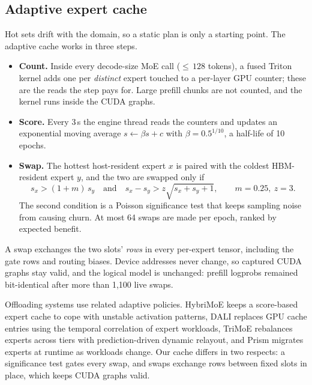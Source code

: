 \documentclass{article}
\begin{document}
\subsection{Adaptive expert cache}\label{sec:adapt}
Hot sets drift with the domain, so a static plan is only a starting point. The adaptive cache works in three steps.
\begin{itemize}
  \item \textbf{Count.} Inside every decode-size MoE call (${\leq}\,128$ tokens), a fused Triton kernel adds one per
        \emph{distinct} expert touched to a per-layer GPU counter; these are the reads the step pays for. Large
        prefill chunks are not counted, and the kernel runs inside the CUDA graphs.
  \item \textbf{Score.} Every 3\,s the engine thread reads the counters and updates an exponential moving average
        $s \leftarrow \beta s + c$ with $\beta = 0.5^{1/10}$, a half-life of 10 epochs.
  \item \textbf{Swap.} The hottest host-resident expert $x$ is paired with the coldest HBM-resident expert $y$, and the
        two are swapped only if
        \begin{equation}
          s_x > (1+m)\, s_y \quad\text{and}\quad s_x - s_y > z \sqrt{s_x + s_y + 1},\qquad m = 0.25,\ z = 3 .
        \end{equation}
        The second condition is a Poisson significance test that keeps sampling noise from causing churn. At most 64
        swaps are made per epoch, ranked by expected benefit.
\end{itemize}
A swap exchanges the two slots' \emph{rows} in every per-expert tensor, including the gate rows and routing biases.
Device addresses never change, so captured CUDA graphs stay valid, and the logical model is unchanged: prefill logprobs
remained bit-identical after more than 1,100 live swaps.

Offloading systems use related adaptive policies. HybriMoE \citep{hybrimoe} keeps a score-based expert cache to cope
with unstable activation patterns, DALI \citep{dali} replaces GPU cache entries using the temporal correlation of expert
workloads, TriMoE \citep{trimoe} rebalances experts across tiers with prediction-driven dynamic relayout, and Prism
\citep{edgeplacement} migrates experts at runtime as workloads change. Our cache differs in two respects: a significance
test gates every swap, and swaps exchange rows between fixed slots in place, which keeps CUDA graphs valid.
\end{document}
